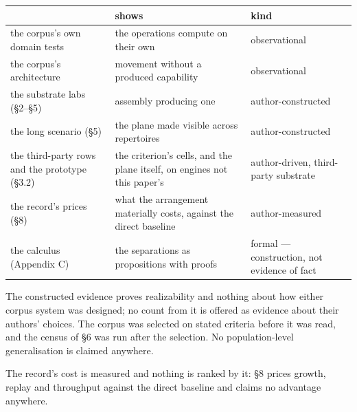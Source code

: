 \documentclass[
]{article}
\newcounter{none} %
\begin{document}
{\def\LTcaptype{none} %
\begin{longtable}[]{@{}
  >{\raggedright\arraybackslash}p{}
  >{\raggedright\arraybackslash}p{}
  >{\raggedright\arraybackslash}p{}@{}}
\toprule\noalign{}
\begin{minipage}[b]{\linewidth}\raggedright
\end{minipage} & \begin{minipage}[b]{\linewidth}\raggedright
shows
\end{minipage} & \begin{minipage}[b]{\linewidth}\raggedright
kind
\end{minipage} \\
\midrule\noalign{}
\endhead
\bottomrule\noalign{}
\endlastfoot
the corpus's own domain tests & the operations compute on their own &
observational \\
the corpus's architecture & movement without a produced capability &
observational \\
the substrate labs (§2--§5) & assembly producing one &
author-constructed \\
the long scenario (§5) & the plane made visible across repertoires &
author-constructed \\
the third-party rows and the prototype (§3.2) & the criterion's cells,
and the plane itself, on engines not this paper's & author-driven,
third-party substrate \\
the record's prices (§8) & what the arrangement materially costs,
against the direct baseline & author-measured \\
the calculus (Appendix C) & the separations as propositions with proofs
& formal --- construction, not evidence of fact \\
\end{longtable}
}

The constructed evidence proves realizability and nothing about how
either corpus system was designed; no count from it is offered as
evidence about their authors' choices. The corpus was selected on stated
criteria before it was read, and the census of §6 was run after the
selection. No population-level generalisation is claimed anywhere.

The record's cost is measured and nothing is ranked by it: §8 prices
growth, replay and throughput against the direct baseline and claims no
advantage anywhere.
\end{document}
